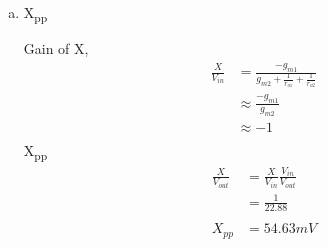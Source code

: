 \documentclass{article}
\begin{document}
\begin{enumerate}[(a)]
\item X\textsubscript{pp}

Gain of X,
\begin{equation*}
\begin{aligned}
\frac{X}{V_{in}} &= \frac{-g_{m1}}{g_{m2} + \frac{1}{r_{o1}} + \frac{1}{r_{o2}}} \\
&\approx \frac{-g_{m1}}{g_{m2}} \\
&\approx -1 \\
\end{aligned}
\end{equation*}
X\textsubscript{pp}
\begin{equation*}
\begin{aligned}
\frac{X}{V_{out}} &= \frac{X}{V_{in}}\frac{V_{in}}{V_{out}} \\
&= \frac{1}{22.88} \\
\\
X_{pp} &= 54.63 mV\\
\end{aligned}
\end{equation*}
\end{enumerate}
\end{document}
